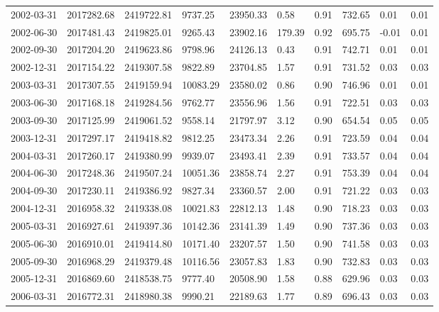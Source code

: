 \begin{landscape}
\begin{longtable}{llllllllll}
2002-03-31 & 2017282.68 & 2419722.81 & 9737.25  & 23950.33 & 0.58   & 0.91         & 732.65   & 0.01     & 0.01     \\
2002-06-30 & 2017481.43 & 2419825.01 & 9265.43  & 23902.16 & 179.39 & 0.92         & 695.75   & -0.01    & 0.01     \\
2002-09-30 & 2017204.20 & 2419623.86 & 9798.96  & 24126.13 & 0.43   & 0.91         & 742.71   & 0.01     & 0.01     \\
2002-12-31 & 2017154.22 & 2419307.58 & 9822.89  & 23704.85 & 1.57   & 0.91         & 731.52   & 0.03     & 0.03     \\
2003-03-31 & 2017307.55 & 2419159.94 & 10083.29 & 23580.02 & 0.86   & 0.90         & 746.96   & 0.01     & 0.01     \\
2003-06-30 & 2017168.18 & 2419284.56 & 9762.77  & 23556.96 & 1.56   & 0.91         & 722.51   & 0.03     & 0.03     \\
2003-09-30 & 2017125.99 & 2419061.52 & 9558.14  & 21797.97 & 3.12   & 0.90         & 654.54   & 0.05     & 0.05     \\
2003-12-31 & 2017297.17 & 2419418.82 & 9812.25  & 23473.34 & 2.26   & 0.91         & 723.59   & 0.04     & 0.04     \\
2004-03-31 & 2017260.17 & 2419380.99 & 9939.07  & 23493.41 & 2.39   & 0.91         & 733.57   & 0.04     & 0.04     \\
2004-06-30 & 2017248.36 & 2419507.24 & 10051.36 & 23858.74 & 2.27   & 0.91         & 753.39   & 0.04     & 0.04     \\
2004-09-30 & 2017230.11 & 2419386.92 & 9827.34  & 23360.57 & 2.00   & 0.91         & 721.22   & 0.03     & 0.03     \\
2004-12-31 & 2016958.32 & 2419338.08 & 10021.83 & 22812.13 & 1.48   & 0.90         & 718.23   & 0.03     & 0.03     \\
2005-03-31 & 2016927.61 & 2419397.36 & 10142.36 & 23141.39 & 1.49   & 0.90         & 737.36   & 0.03     & 0.03     \\
2005-06-30 & 2016910.01 & 2419414.80 & 10171.40 & 23207.57 & 1.50   & 0.90         & 741.58   & 0.03     & 0.03     \\
2005-09-30 & 2016968.29 & 2419379.48 & 10116.56 & 23057.83 & 1.83   & 0.90         & 732.83   & 0.03     & 0.03     \\
2005-12-31 & 2016869.60 & 2418538.75 & 9777.40  & 20508.90 & 1.58   & 0.88         & 629.96   & 0.03     & 0.03     \\
2006-03-31 & 2016772.31 & 2418980.38 & 9990.21  & 22189.63 & 1.77   & 0.89         & 696.43   & 0.03     & 0.03     \\

\end{longtable}
\end{landscape}
